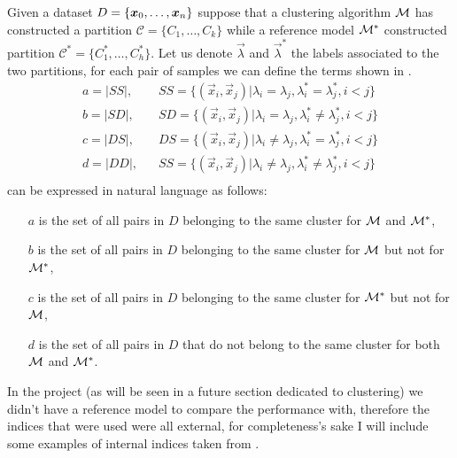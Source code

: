 Given a dataset $D = \{\boldsymbol{x}_0, \ldots, \boldsymbol{x}_n\}$ suppose that a clustering algorithm $\mathcal{M}$ has constructed a partition
$\mathcal{C} = \{C_1, \ldots, C_k\}$ while a reference model $\mathcal{M}^*$ constructed partition
$\mathcal{C}^*=\{C^*_1, \ldots, C^*_h\}$. Let us denote $\vec{\lambda}$ and $\vec{\lambda}^*$ the
labels associated to the two partitions, for each pair of samples we can define the terms shown in
.
\begin{equation}
	\label{eq:clustering-terms}
	\begin{aligned}
		a =|SS|, \hspace{10pt} &SS = \{(\vec{x}_i, \vec{x}_j) | \lambda_i = \lambda_j, \lambda^*_i =
		\lambda^*_j, i < j\} \\
		b =|SD|, \hspace{10pt} &SD = \{(\vec{x}_i, \vec{x}_j) | \lambda_i = \lambda_j, \lambda^*_i
		\neq \lambda^*_j, i < j\} \\
		c =|DS|, \hspace{10pt} &DS = \{(\vec{x}_i, \vec{x}_j) | \lambda_i \neq \lambda_j, \lambda^*_i =
		\lambda^*_j, i < j\} \\
		d =|DD|, \hspace{10pt} &SS = \{(\vec{x}_i, \vec{x}_j) | \lambda_i \neq \lambda_j,
		\lambda^*_i \neq \lambda^*_j, i < j\} \\
	\end{aligned}
\end{equation}
 can be expressed in natural language as follows:
\begin{itemize}
	\item[$a$] is the set of all pairs in $D$ belonging to the same cluster for $\mathcal{M}$ and
		$\mathcal{M}^*$,
	\item[$b$] is the set of all pairs in $D$ belonging to the same cluster for $\mathcal{M}$ but not
		for $\mathcal{M}^*$,
	\item[$c$] is the set of all pairs in $D$ belonging to the same cluster for $\mathcal{M}^*$ but
		not for $\mathcal{M}$,
	\item[$d$] is the set of all pairs in $D$ that do not belong to the same cluster for both
		$\mathcal{M}$ and $\mathcal{M}^*$.
\end{itemize}
In the project (as will be seen in a future section dedicated to clustering) we didn't have a
reference model to compare the performance with, therefore the indices that were used were all
external, for completeness's sake I will include some examples of internal indices taken from
\cite{ZhouZhi-Hua2021ML}.

